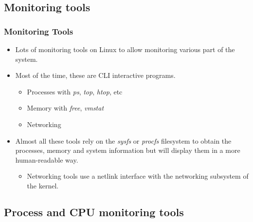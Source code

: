 \subsection{Monitoring tools}

\begin{frame}
  \frametitle{Monitoring Tools}
  \begin{itemize}
    \item Lots of monitoring tools on Linux to allow monitoring various part of
          the system.
    \item Most of the time, these are CLI interactive programs.
    \begin{itemize}
        \item Processes with {\em ps}, {\em top}, {\em htop}, etc
        \item Memory with {\em free}, {\em vmstat}
        \item Networking
    \end{itemize}
    \item Almost all these tools rely on the {\em sysfs} or {\em procfs}
          filesystem to obtain the processes, memory and system information but
          will display them in a more human-readable way.
    \begin{itemize}
      \item Networking tools use a netlink interface with the networking
            subsystem of the kernel.
    \end{itemize}
  \end{itemize}
\end{frame}

\subsection{Process and CPU monitoring tools}

